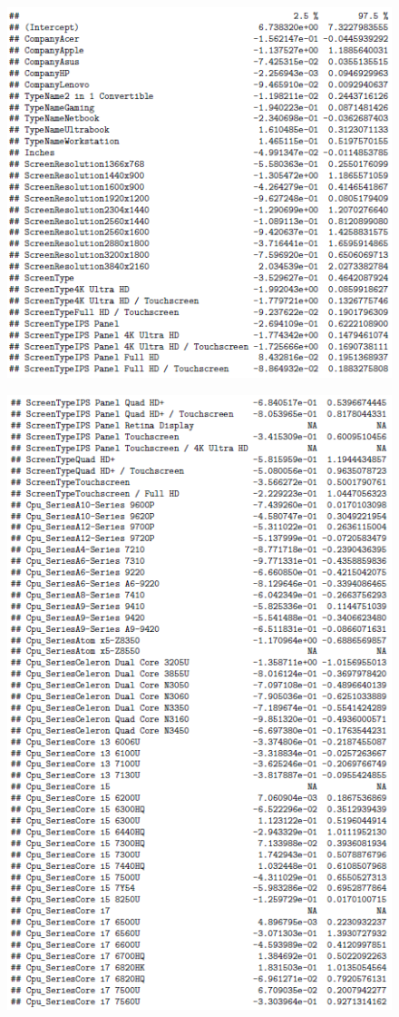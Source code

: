 \documentclass[12pt]{article}
\begin{document}
\begin{figure}[h!]
    \centering
    \includegraphics{Model_2_CI(1_5).png}
    \label{fig:CI21}
\end{figure}
\begin{figure}[h!]
    \centering
    \includegraphics{Model_2_CI(2_5).png}
    \label{fig:CI22}
\end{figure}
\end{document}
